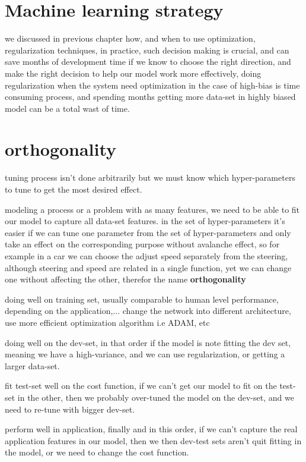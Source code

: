 \documentclass[4apaper,12pt]{book}
\begin{document}
  \section{Machine learning strategy}
  \begin{description}
  \item we discussed in previous chapter how, and when to use optimization, regularization techniques, in practice, such decision making is crucial, and can save months of development time if we know to choose the right direction, and make the right decision to help our model work more effectively, doing regularization when the system need optimization in the case of high-bias is time consuming process, and spending months getting more data-set in highly biased model can be a total wast of time.
    \section{orthogonality}
  \item tuning process isn't done arbitrarily  but we must know which hyper-parameters to tune to get the most desired effect.
  \item modeling a process or a problem with as many features, we need to be able to fit our model to capture all data-set features. in the set of hyper-parameters it's easier if we can tune one parameter from the set of hyper-parameters and only take an effect on the corresponding purpose without avalanche effect, so for example in a car we can choose the adjust speed separately from the steering, although steering and speed are related in a single function, yet we can change one without affecting the other, therefor the name \textbf{orthogonality}
  \item doing well on training set, usually comparable to human level performance, depending on the application,... change the network into different architecture, use more efficient optimization algorithm i.e ADAM, etc
  \item doing well on the dev-set, in that order if the model is note fitting the dev set, meaning we have a high-variance, and we can use regularization, or getting a larger data-set.
  \item fit test-set well on the cost function, if we can't get our model to fit on the test-set in the other, then we probably over-tuned the model on the dev-set, and we need to re-tune with bigger dev-set.
  \item perform well in application, finally and in this order, if we can't capture the real application features in our model, then we then dev-test sets aren't quit fitting in the model, or we need to change the cost function.

\end{description}
\end{document}
